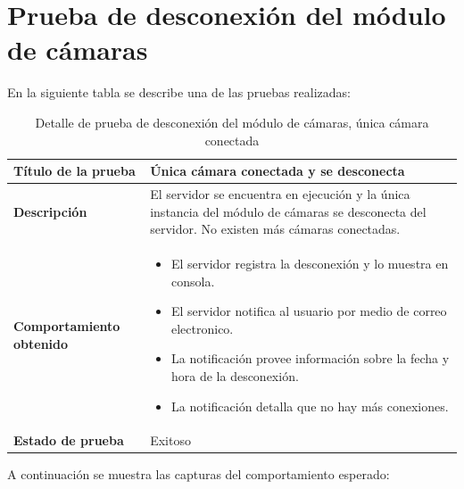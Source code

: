 \section{Prueba de desconexión del módulo de cámaras}

En la siguiente tabla se describe una de las pruebas realizadas:\\

\begin{table}[H]
    \caption{Detalle de prueba de desconexión del módulo de cámaras, única cámara conectada}
    \begin{center}
        \begin{tabular}{|>{\centering}p{}|m{}<{\centering}|} 
            \hline
            \textbf{Título de la prueba} & Única cámara conectada y se desconecta \\
            \hline
            \textbf{Descripción} & El servidor se encuentra en ejecución y la única instancia del módulo de cámaras se desconecta del servidor. No existen más cámaras conectadas.\\
            \hline
            \textbf{Comportamiento obtenido} & 
            \begin{itemize}
                \item El servidor registra la desconexión y lo muestra en consola.
                \item El servidor notifica al usuario por medio de correo electronico.
                \item La notificación provee información sobre la fecha y hora de la desconexión.
                \item La notificación detalla que no hay más conexiones.
            \end{itemize} \\ 
            \hline
            \textbf{Estado de prueba} & Exitoso \\
            \hline
        \end{tabular}
    \end{center}
\end{table}
A continuación se muestra las capturas del comportamiento esperado:\\

